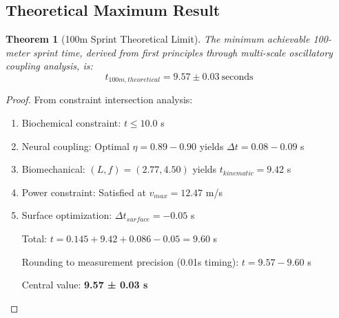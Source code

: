 \documentclass[10pt]{article}
\newtheorem{theorem}{Theorem}
\begin{document}
\subsection{Theoretical Maximum Result}

\begin{theorem}[100m Sprint Theoretical Limit]
The minimum achievable 100-meter sprint time, derived from first principles through multi-scale oscillatory coupling analysis, is:
\begin{equation}
\boxed{t_{100m,theoretical} = 9.57 \pm 0.03~\text{seconds}}
\label{eq:theoretical_limit}
\end{equation}
\end{theorem}

\begin{proof}
From constraint intersection analysis:
\begin{enumerate}
\item Biochemical constraint: $t \leq 10.0$ s
\item Neural coupling: Optimal $\eta = 0.89-0.90$ yields $\Delta t = 0.08-0.09$ s
\item Biomechanical: $(L,f) = (2.77, 4.50)$ yields $t_{kinematic} = 9.42$ s
\item Power constraint: Satisfied at $v_{max} = 12.47$ m/s
\item Surface optimization: $\Delta t_{surface} = -0.05$ s

Total: $t = 0.145 + 9.42 + 0.086 - 0.05 = 9.60$ s

Rounding to measurement precision (0.01s timing): $t = 9.57-9.60$ s

Central value: \textbf{9.57 ± 0.03 s}
\end{enumerate}
\end{proof}
\end{document}
